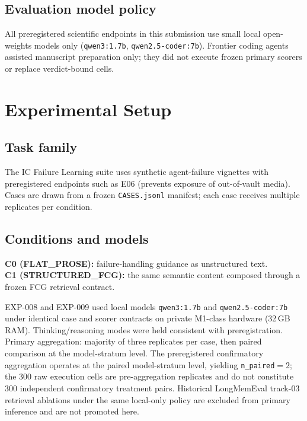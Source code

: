 \documentclass{article}
\begin{document}
\subsection{Evaluation model policy}

All preregistered scientific endpoints in this submission use small local open-weights models only (\texttt{qwen3:1.7b}, \texttt{qwen2.5-coder:7b}).
Frontier coding agents assisted manuscript preparation only; they did not execute frozen primary scorers or replace verdict-bound cells.

\section{Experimental Setup}

\subsection{Task family}

The IC Failure Learning suite uses synthetic agent-failure vignettes with preregistered endpoints such as E06 (prevents exposure of out-of-vault media).
Cases are drawn from a frozen \texttt{CASES.jsonl} manifest; each case receives multiple replicates per condition.

\subsection{Conditions and models}

\textbf{C0 (FLAT\_PROSE):} failure-handling guidance as unstructured text.\\
\textbf{C1 (STRUCTURED\_FCG):} the same semantic content composed through a frozen FCG retrieval contract.

EXP-008 and EXP-009 used local models \texttt{qwen3:1.7b} and \texttt{qwen2.5-coder:7b} under identical case and scorer contracts on private M1-class hardware (32\,GB RAM).
Thinking/reasoning modes were held consistent with preregistration.
Primary aggregation: majority of three replicates per case, then paired comparison at the model-stratum level.
The preregistered confirmatory aggregation operates at the paired model-stratum level, yielding \texttt{n\_paired}$=2$; the 300 raw execution cells are pre-aggregation replicates and do not constitute 300 independent confirmatory treatment pairs.
Historical LongMemEval track-03 retrieval ablations under the same local-only policy are excluded from primary inference and are not promoted here.
\end{document}
